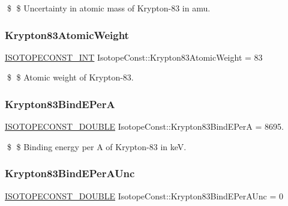 \$ \$ Uncertainty in atomic mass of Krypton-\/83 in amu. \mbox{\label{group___isotope_const-_krypton-_kr83_ga7d49a4d4abb43834ce54a1f9b3fbd6d6}} 
\subsubsection{\texorpdfstring{Krypton83\+Atomic\+Weight}{Krypton83AtomicWeight}}
{\footnotesize\ttfamily \mbox{\hyperlink{group___isotope_const-_macros_ga5f18360b3e99483a35c32d789e62621c}{I\+S\+O\+T\+O\+P\+E\+C\+O\+N\+S\+T\+\_\+\+I\+NT}} Isotope\+Const\+::\+Krypton83\+Atomic\+Weight = 83}

\$ \$ Atomic weight of Krypton-\/83. \mbox{\label{group___isotope_const-_krypton-_kr83_gaff29141ebb835fd5657b2b8989338c55}} 
\subsubsection{\texorpdfstring{Krypton83\+Bind\+E\+PerA}{Krypton83BindEPerA}}
{\footnotesize\ttfamily \mbox{\hyperlink{group___isotope_const-_macros_ga8f45a7272ce02c0b4c65c44636ed719a}{I\+S\+O\+T\+O\+P\+E\+C\+O\+N\+S\+T\+\_\+\+D\+O\+U\+B\+LE}} Isotope\+Const\+::\+Krypton83\+Bind\+E\+PerA = 8695.}

\$ \$ Binding energy per A of Krypton-\/83 in keV. \mbox{\label{group___isotope_const-_krypton-_kr83_gafe940dbf08eec8fe0a0c9cfd4f0bd167}} 
\subsubsection{\texorpdfstring{Krypton83\+Bind\+E\+Per\+A\+Unc}{Krypton83BindEPerAUnc}}
{\footnotesize\ttfamily \mbox{\hyperlink{group___isotope_const-_macros_ga8f45a7272ce02c0b4c65c44636ed719a}{I\+S\+O\+T\+O\+P\+E\+C\+O\+N\+S\+T\+\_\+\+D\+O\+U\+B\+LE}} Isotope\+Const\+::\+Krypton83\+Bind\+E\+Per\+A\+Unc = 0}

